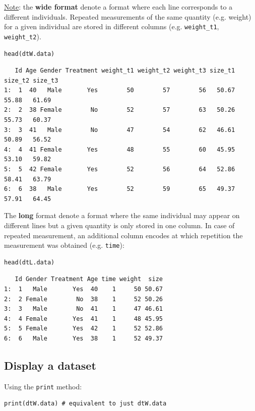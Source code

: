 \documentclass{article}
\begin{document}
\bigskip

\uline{Note}: the \textbf{wide format} denote a format where each line corresponds
to a different individuals. Repeated measurements of the same quantity
(e.g. weight) for a given individual are stored in different columns
(e.g. \texttt{weight\_t1}, \texttt{weight\_t2}).

\lstset{language=r,label= ,caption= ,captionpos=b,numbers=none}
\begin{lstlisting}
head(dtW.data)
\end{lstlisting}

\begin{verbatim}
   Id Age Gender Treatment weight_t1 weight_t2 weight_t3 size_t1 size_t2 size_t3
1:  1  40   Male       Yes        50        57        56   50.67   55.88   61.69
2:  2  38 Female        No        52        57        63   50.26   55.73   60.37
3:  3  41   Male        No        47        54        62   46.61   50.89   56.52
4:  4  41 Female       Yes        48        55        60   45.95   53.10   59.82
5:  5  42 Female       Yes        52        56        64   52.86   58.41   63.79
6:  6  38   Male       Yes        52        59        65   49.37   57.91   64.45
\end{verbatim}

 The \textbf{long} format denote a format where the same individual may
appear on different lines but a given quantity is only stored in one
column. In case of repeated measurement, an additional column encodes
at which repetition the measurement was obtained (e.g. \texttt{time}):
\lstset{language=r,label= ,caption= ,captionpos=b,numbers=none}
\begin{lstlisting}
head(dtL.data)
\end{lstlisting}

\begin{verbatim}
   Id Gender Treatment Age time weight  size
1:  1   Male       Yes  40    1     50 50.67
2:  2 Female        No  38    1     52 50.26
3:  3   Male        No  41    1     47 46.61
4:  4 Female       Yes  41    1     48 45.95
5:  5 Female       Yes  42    1     52 52.86
6:  6   Male       Yes  38    1     52 49.37
\end{verbatim}

\subsection{Display a dataset}
\label{sec:org729d351}

Using the \texttt{print} method:
\lstset{language=r,label= ,caption= ,captionpos=b,numbers=none}
\begin{lstlisting}
print(dtW.data) # equivalent to just dtW.data
\end{lstlisting}
\end{document}
